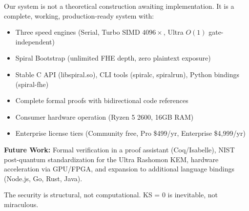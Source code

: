 \documentclass[11pt,a4paper]{article}
\begin{document}
Our system is not a theoretical construction awaiting implementation. It is a complete, working, production-ready system with:
\begin{itemize}[nosep]
    \item Three speed engines (Serial, Turbo SIMD $4096\times$, Ultra $O(1)$ gate-independent)
    \item Spiral Bootstrap (unlimited FHE depth, zero plaintext exposure)
    \item Stable C API (libspiral.so), CLI tools (spiralc, spiralrun), Python bindings (spiral-fhe)
    \item Complete formal proofs with bidirectional code references
    \item Consumer hardware operation (Ryzen 5 2600, 16GB RAM)
    \item Enterprise license tiers (Community free, Pro \$499/yr, Enterprise \$4,999/yr)
\end{itemize}

\textbf{Future Work:} Formal verification in a proof assistant (Coq/Isabelle), NIST post-quantum standardization for the Ultra Rashomon KEM, hardware acceleration via GPU/FPGA, and expansion to additional language bindings (Node.js, Go, Rust, Java).

The security is structural, not computational. KS = 0 is inevitable, not miraculous.

\end{document}

